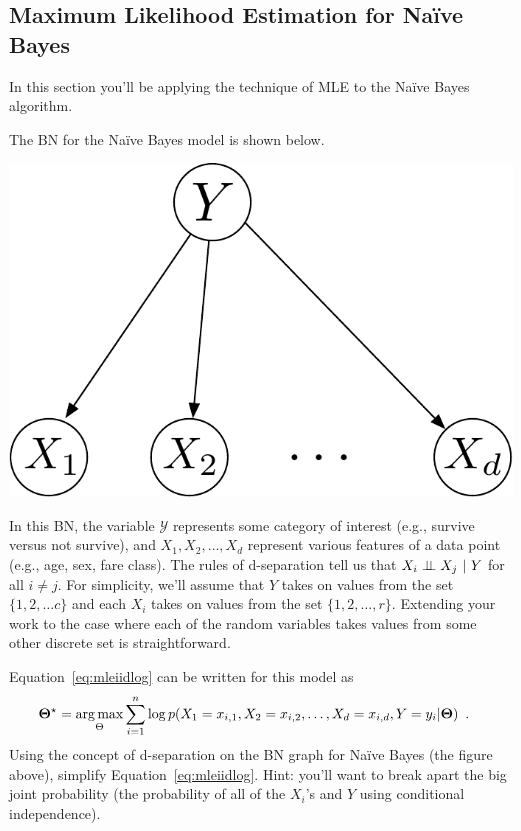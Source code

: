 \documentclass[assignment04_Solutions]{subfiles}
\begin{document}
\subsection{Maximum Likelihood Estimation for Na\"ive Bayes}

In this section you'll be applying the technique of MLE to the Na\"ive Bayes algorithm.



\vspace{1em}
\begin{exercise}[(60 minutes)]
The BN for the Na\"ive Bayes model is shown below.

\begin{center}
\includegraphics[width=0.3\linewidth]{figures/naivebayesgm}
\end{center}

In this BN, the variable $\mathcal{Y}$ represents some category of interest (e.g., survive versus not survive), and $X_1, X_2, \ldots, X_d$ represent various features of a data point (e.g., age, sex, fare class).  The rules of d-separation tell us that $X_i \perp\!\!\!\perp X_j~|~Y$ for all $i \neq j$.  For simplicity, we'll assume that $Y$ takes on values from the set $\{1, 2, \ldots c \}$ and each $X_i$ takes on values from the set $\{1, 2, \ldots, r\}$.  Extending your work to the case where each of the random variables takes values from some other discrete set is straightforward.


\bes
\item Equation~\ref{eq:mleiidlog} can be written for this model as
\begin{align}
\mathbf{\Theta^\star} &= \operatorname*{arg\,max}_{\Theta} \sum_{i=1}^n \log p(X_1 = x_{i,1}, X_2 = x_{i,2}, \ldots, X_d = x_{i,d}, Y = y_i | \mathbf{\Theta}) \enspace . \label{eq:nbmle}
\end{align}
Using the concept of d-separation on the BN graph for Na\"ive Bayes (the figure above), simplify Equation~\ref{eq:mleiidlog}.  Hint: you'll want to break apart the big joint probability (the probability of all of the $X_i$'s and $Y$ using conditional independence). %


\end{exercise}
\end{document}
